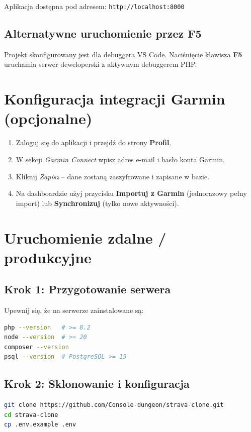 \documentclass[12pt,a4paper]{report}
\begin{document}
Aplikacja dostępna pod adresem: \texttt{http://localhost:8000}

\subsection{Alternatywne uruchomienie przez F5}

Projekt skonfigurowany jest dla debuggera VS Code. Naciśnięcie klawisza \textbf{F5} uruchamia serwer deweloperski z aktywnym debuggerem PHP.

\section{Konfiguracja integracji Garmin (opcjonalne)}

\begin{enumerate}
    \item Zaloguj się do aplikacji i przejdź do strony \textbf{Profil}.
    \item W sekcji \textit{Garmin Connect} wpisz adres e-mail i hasło konta Garmin.
    \item Kliknij \textit{Zapisz} -- dane zostaną zaszyfrowane i zapisane w bazie.
    \item Na dashboardzie użyj przycisku \textbf{Importuj z Garmin} (jednorazowy pełny import) lub \textbf{Synchronizuj} (tylko nowe aktywności).
\end{enumerate}

\section{Uruchomienie zdalne / produkcyjne}

\subsection{Krok 1: Przygotowanie serwera}

Upewnij się, że na serwerze zainstalowane są:
\begin{lstlisting}[language=bash, numbers=none]
php --version   # >= 8.2
node --version  # >= 20
composer --version
psql --version  # PostgreSQL >= 15
\end{lstlisting}

\subsection{Krok 2: Sklonowanie i konfiguracja}

\begin{lstlisting}[language=bash, numbers=none]
git clone https://github.com/Console-dungeon/strava-clone.git
cd strava-clone
cp .env.example .env
\end{lstlisting}
\end{document}
